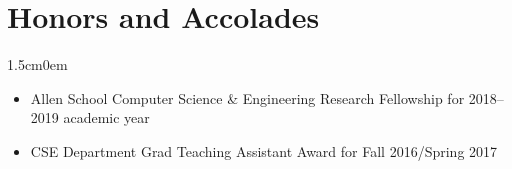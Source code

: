 \documentclass[letterpaper]{article}
\newcommand{\primaryindent}{1.5cm} %
\newenvironment{indented}{\begin{adjustwidth}{\primaryindent}{0em}}{\end{adjustwidth}}
\newenvironment{resumelist}{\begin{itemize}[topsep=0pt,noitemsep,itemindent=-15pt,leftmargin=30pt]}{\end{itemize}}
\begin{document}
\section*{Honors and Accolades}
\begin{indented}
	\begin{resumelist}
  \item Allen School Computer Science \& Engineering Research Fellowship for 2018--2019 academic year
	\item CSE Department Grad Teaching Assistant Award for Fall 2016/Spring 2017
	\end{resumelist}
\end{indented}

\nocite{*}

\renewcommand{\refname}{Publications}

\end{document}
